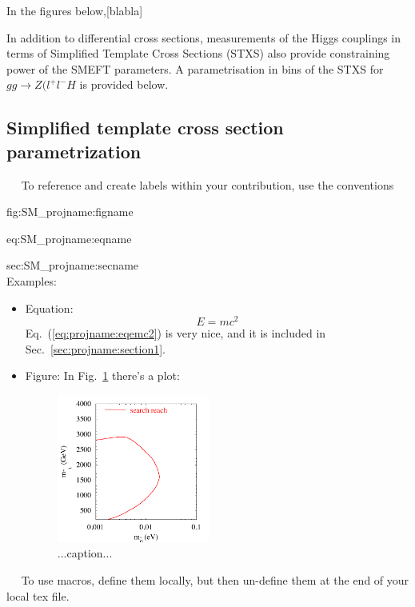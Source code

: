 In the figures below,[blabla]



In addition to differential cross sections, measurements  of the Higgs couplings in terms of Simplified Template Cross Sections (STXS) also provide constraining power of the SMEFT parameters. A parametrisation in bins of the STXS for $gg\to Z(l^{+}l^{-}H$  is provided below. 
 
\subsection{Simplified template cross section parametrization}
\label{sec:higgseft:section3}









~\newline~
To reference and create labels within your contribution, use the conventions

fig:SM\_projname:figname

eq:SM\_projname:eqname

sec:SM\_projname:secname\\
Examples:
\begin{itemize}
\item Equation:
  \begin{equation}
    E = m c^2
    \label{eq:projname:eqemc2}
  \end{equation}
  Eq.~(\ref{eq:projname:eqemc2}) is very nice, and it is included in Sec.~\ref{sec:projname:section1}.
\item Figure: In Fig.~\ref{fig:projname:plot1} there's a plot:
\begin{figure}[htbp]
  \begin{center}
    \includegraphics[width=5cm]{Fig1.pdf}
    \caption{...caption...}
    \label{fig:projname:plot1}
  \end{center}
\end{figure}
\end{itemize}
~\newline~
To use macros, define them locally, but then un-define them at the end of your local tex file.

